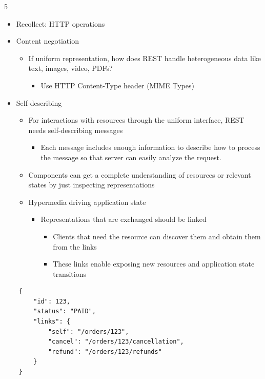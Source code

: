 \documentclass[landscape,a4paper]{extarticle}
\begin{document}
\begin{multicols*}{5}
\begin{itemize}
\begin{itemize}
            \verb|/device-management/managed-devices/{id}|
        \end{itemize}
        \item Recollect: HTTP operations
        \item Content negotiation
        \begin{itemize}
            \item If uniform representation, how does REST handle heterogeneous data like text,
            images, video, PDFs?
            \begin{itemize}
                \item Use HTTP Content-Type header (MIME Types)
            \end{itemize}
        \end{itemize}
        \item Self-describing
        \begin{itemize}
            \item For interactions with resources through the uniform interface, REST needs self-describing messages
            \begin{itemize}
                \item Each message includes enough information to describe how to process the message
                so that server can easily analyze the request.
            \end{itemize}
            \item Components can get a complete understanding of resources or relevant states
            by just inspecting representations
            \item Hypermedia driving application state
            \begin{itemize}
                \item Representations that are exchanged should be linked
                \begin{itemize}
                    \item Clients that need the resource can discover them and obtain them from the links
                    \item These links enable exposing new resources and application state transitions
                \end{itemize}
            \end{itemize}
        \end{itemize}
    \end{itemize}
    \begin{verbatim}
    {
        "id": 123,
        "status": "PAID",
        "links": {
            "self": "/orders/123",
            "cancel": "/orders/123/cancellation",
            "refund": "/orders/123/refunds"
        }
    }
    \end{verbatim}


\end{multicols*}
\end{document}
